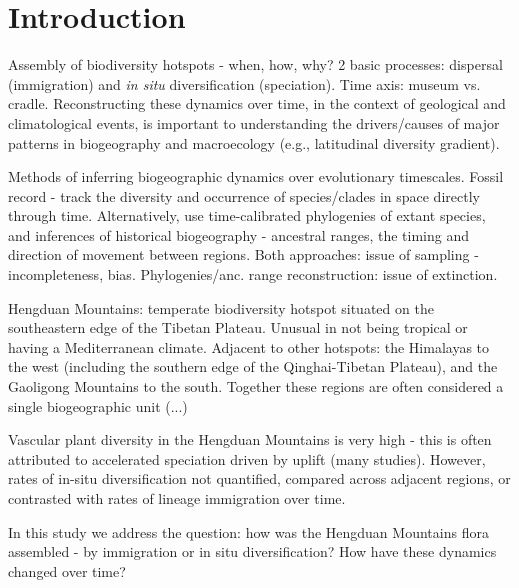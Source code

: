 \section{Introduction}

Assembly of biodiversity hotspots - when, how, why? 2 basic processes: dispersal (immigration) and \textit{in situ} diversification (speciation). Time axis: museum vs. cradle. Reconstructing these dynamics over time, in the context of geological and climatological events, is important to understanding the drivers/causes of major patterns in biogeography and macroecology (e.g., latitudinal diversity gradient).

Methods of inferring biogeographic dynamics over evolutionary timescales. Fossil record - track the diversity and occurrence of species/clades in space directly through time. Alternatively, use time-calibrated phylogenies of extant species, and inferences of historical biogeography - ancestral ranges, the timing and direction of movement between regions. Both approaches: issue of sampling - incompleteness, bias. Phylogenies/anc. range reconstruction: issue of extinction.

Hengduan Mountains: temperate biodiversity hotspot situated on the southeastern edge of the Tibetan Plateau. Unusual in not being tropical or having a Mediterranean climate. Adjacent to other hotspots: the Himalayas to the west (including the southern edge of the Qinghai-Tibetan Plateau), and the Gaoligong Mountains to the south. Together these regions are often considered a single biogeographic unit (...)

Vascular plant diversity in the Hengduan Mountains is very high - this is often attributed to accelerated speciation driven by uplift (many studies). However, rates of in-situ diversification not quantified, compared across adjacent regions, or contrasted with rates of lineage immigration over time.

In this study we address the question: how was the Hengduan Mountains flora assembled - by immigration or in situ diversification? How have these dynamics changed over time?
